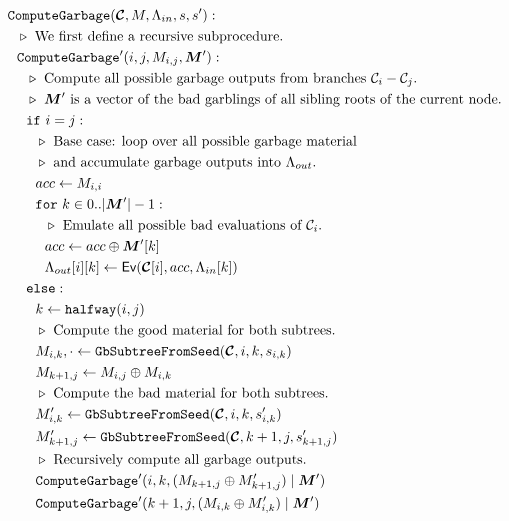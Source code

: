 \begin{figure}
  \begin{align*}
    &\computegarbage(\vec{\cir}, \mat, \Lambda_{in}, s, s'):\\
    &~~\codecomment{We first define a recursive subprocedure.}\\
    &~~\computegarbage'(i, j, \mat_{i,j}, \vec{\mat}'):\\
    &~~~~\codecomment{Compute all possible garbage outputs from
    branches $\cir_i-\cir_j$.}\\
    &~~~~\codecomment{$\vec{\mat}'$ is a vector of the bad garblings of
      all sibling roots of the current node.}\\
    &~~~~\cif~i = j:\\
    &~~~~~~\codecomment{Base case: loop over all possible garbage material}\\
    &~~~~~~\codecomment{and accumulate garbage outputs into
    $\Lambda_{out}$.}\\
    &~~~~~~acc \gets \mat_{i,i}\\
    &~~~~~~\cfor~k \in 0..|\vec{\mat}'|-1:\\
    &~~~~~~~~\codecomment{Emulate all possible bad evaluations of $\cir_i$.}\\
    &~~~~~~~~acc \gets acc \oplus \vec{\mat}'[k]\\
    &~~~~~~~~\Lambda_{out}[i][k] \gets \gEv(\vec{\cir}[i], acc, \Lambda_{in}[k])\\
    &~~~~\celse:\\
    &~~~~~~k \gets \halfway(i, j)\\
    &~~~~~~\codecomment{Compute the good material for both subtrees.}\\
    &~~~~~~\mat_{i, k}, \cdot \gets \gbtree(\vec{\cir}, i, k, s_{i, k})\\
    &~~~~~~\mat_{k+1, j} \gets \mat_{i, j} \oplus \mat_{i, k}\\
    &~~~~~~\codecomment{Compute the bad material for both subtrees.}\\
    &~~~~~~\mat_{i, k}' \gets \gbtree(\vec{\cir}, i, k, s'_{i, k})\\
    &~~~~~~\mat_{k+1, j}' \gets \gbtree(\vec{\cir}, k+1, j, s'_{k+1, j})\\
    &~~~~~~\codecomment{Recursively compute all garbage outputs.}\\
    &~~~~~~\computegarbage'(i, k, (\mat_{k+1,j} \oplus \mat_{k+1,j}') \mid \vec{\mat}')\\
    &~~~~~~\computegarbage'(k+1, j, (\mat_{i,k} \oplus \mat_{i,k}') \mid \vec{\mat}')\\

\end{align*}
\end{figure}
